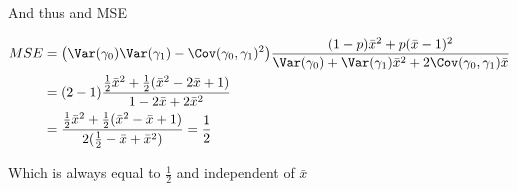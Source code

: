 And thus and MSE

\begin{align*}
	MSE &= \big(\Var(\gamma_0) \Var(\gamma_1) - \Cov(\gamma_0, \gamma_1)^2 \big)\frac{(1 - p) \bar{x}^2  + p(\bar{x} - 1)^2 }{\Var(\gamma_0) + \Var(\gamma_1) \bar{x}^2 + 2 \Cov(\gamma_0, \gamma_1) \bar{x}} \\
		&= (2 - 1)\frac{\frac{1}{2} \bar{x}^2 + \frac{1}{2}(\bar{x}^2 - 2 \bar{x} + 1)}{1 - 2 \bar{x} + 2 \bar{x}^2} \\
		&= \frac{\frac{1}{2} \bar{x}^2 + \frac{1}{2}(\bar{x}^2 -  \bar{x} + 1)}{2(\frac{1}{2} -  \bar{x} + \bar{x}^2)} = \frac{1}{2}
\end{align*} 

Which is always equal to $\frac{1}{2}$ and independent of $\bar{x}$

